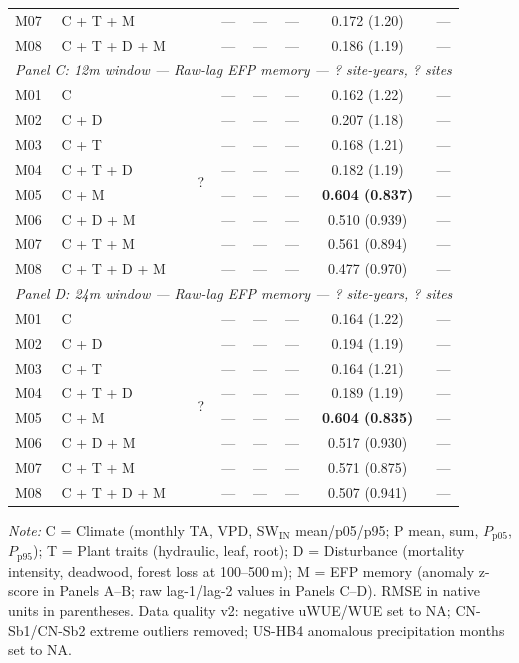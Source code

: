 \begin{table}[htbp]
\begin{tabular}{llcccccc}
M07 & C + T + M &  & --- & --- & --- & 0.172 (1.20) & --- \\
M08 & C + T + D + M &  & --- & --- & --- & 0.186 (1.19) & --- \\
\midrule
\multicolumn{8}{l}{\textit{Panel C: 12m window --- Raw-lag EFP memory --- ? site-years, ? sites}} \\
\midrule
M01 & C & \multirow{8}{*}{?} & --- & --- & --- & 0.162 (1.22) & --- \\
M02 & C + D &  & --- & --- & --- & 0.207 (1.18) & --- \\
M03 & C + T &  & --- & --- & --- & 0.168 (1.21) & --- \\
M04 & C + T + D &  & --- & --- & --- & 0.182 (1.19) & --- \\
M05 & C + M &  & --- & --- & --- & \textbf{0.604 (0.837)} & --- \\
M06 & C + D + M &  & --- & --- & --- & 0.510 (0.939) & --- \\
M07 & C + T + M &  & --- & --- & --- & 0.561 (0.894) & --- \\
M08 & C + T + D + M &  & --- & --- & --- & 0.477 (0.970) & --- \\
\midrule
\multicolumn{8}{l}{\textit{Panel D: 24m window --- Raw-lag EFP memory --- ? site-years, ? sites}} \\
\midrule
M01 & C & \multirow{8}{*}{?} & --- & --- & --- & 0.164 (1.22) & --- \\
M02 & C + D &  & --- & --- & --- & 0.194 (1.19) & --- \\
M03 & C + T &  & --- & --- & --- & 0.164 (1.21) & --- \\
M04 & C + T + D &  & --- & --- & --- & 0.189 (1.19) & --- \\
M05 & C + M &  & --- & --- & --- & \textbf{0.604 (0.835)} & --- \\
M06 & C + D + M &  & --- & --- & --- & 0.517 (0.930) & --- \\
M07 & C + T + M &  & --- & --- & --- & 0.571 (0.875) & --- \\
M08 & C + T + D + M &  & --- & --- & --- & 0.507 (0.941) & --- \\
\midrule
\bottomrule
\end{tabular}
\vspace{2pt}
\begin{minipage}{\linewidth}
\footnotesize
\textit{Note:} C = Climate (monthly TA, VPD, SW$_\mathrm{IN}$ mean/p05/p95;
P mean, sum, $P_\mathrm{p05}$, $P_\mathrm{p95}$); T = Plant traits (hydraulic, leaf, root);
D = Disturbance (mortality intensity, deadwood, forest loss at 100--500\,m);
M = EFP memory (anomaly z-score in Panels A--B; raw lag-1/lag-2 values in Panels C--D).
RMSE in native units in parentheses. Data quality v2: negative uWUE/WUE set to NA;
CN-Sb1/CN-Sb2 extreme outliers removed; US-HB4 anomalous precipitation months set to NA.
\end{minipage}
\end{table}
